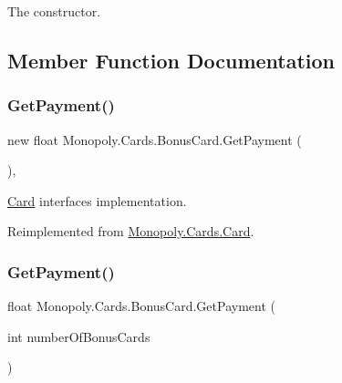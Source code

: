 The constructor. 

\subsection{Member Function Documentation}
\mbox{\label{class_monopoly_1_1_cards_1_1_bonus_card_af017cfbb4591f7afeca653b87aae9bb1}} 
\subsubsection{\texorpdfstring{Get\+Payment()}{GetPayment()}\hspace{0.1cm}{\footnotesize\ttfamily [1/2]}}
{\footnotesize\ttfamily new float Monopoly.\+Cards.\+Bonus\+Card.\+Get\+Payment (\begin{DoxyParamCaption}{ }\end{DoxyParamCaption})\hspace{0.3cm}{\ttfamily [inline]}, {\ttfamily [virtual]}}

\mbox{\hyperlink{class_monopoly_1_1_cards_1_1_card}{Card}} interface\textquotesingle{}s implementation. 

Reimplemented from \mbox{\hyperlink{class_monopoly_1_1_cards_1_1_card_a3a30376e286fdae69bf7c77cd6620fe3}{Monopoly.\+Cards.\+Card}}.

\mbox{\label{class_monopoly_1_1_cards_1_1_bonus_card_a588a1016314ff62faab1fb693b340bfe}} 
\subsubsection{\texorpdfstring{Get\+Payment()}{GetPayment()}\hspace{0.1cm}{\footnotesize\ttfamily [2/2]}}
{\footnotesize\ttfamily float Monopoly.\+Cards.\+Bonus\+Card.\+Get\+Payment (\begin{DoxyParamCaption}\item[{int}]{number\+Of\+Bonus\+Cards }\end{DoxyParamCaption})\hspace{0.3cm}{\ttfamily [inline]}}

